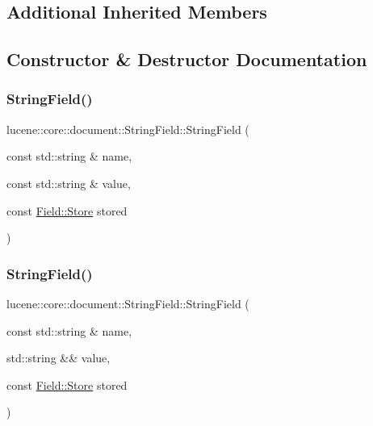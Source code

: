\subsection*{Additional Inherited Members}


\subsection{Constructor \& Destructor Documentation}
\mbox{\label{classlucene_1_1core_1_1document_1_1StringField_af114024658947018095142ba97f04658}} 
\subsubsection{\texorpdfstring{String\+Field()}{StringField()}\hspace{0.1cm}{\footnotesize\ttfamily [1/4]}}
{\footnotesize\ttfamily lucene\+::core\+::document\+::\+String\+Field\+::\+String\+Field (\begin{DoxyParamCaption}\item[{const std\+::string \&}]{name,  }\item[{const std\+::string \&}]{value,  }\item[{const \mbox{\hyperlink{classlucene_1_1core_1_1document_1_1Field_a7d5d79f0c56d3548ab8d46d0e7dae35d}{Field\+::\+Store}}}]{stored }\end{DoxyParamCaption})\hspace{0.3cm}{\ttfamily [inline]}}

\mbox{\label{classlucene_1_1core_1_1document_1_1StringField_afec933d8b7bd771b1e00e00e0a5290d0}} 
\subsubsection{\texorpdfstring{String\+Field()}{StringField()}\hspace{0.1cm}{\footnotesize\ttfamily [2/4]}}
{\footnotesize\ttfamily lucene\+::core\+::document\+::\+String\+Field\+::\+String\+Field (\begin{DoxyParamCaption}\item[{const std\+::string \&}]{name,  }\item[{std\+::string \&\&}]{value,  }\item[{const \mbox{\hyperlink{classlucene_1_1core_1_1document_1_1Field_a7d5d79f0c56d3548ab8d46d0e7dae35d}{Field\+::\+Store}}}]{stored }\end{DoxyParamCaption})\hspace{0.3cm}{\ttfamily [inline]}}

